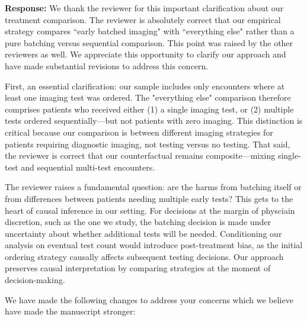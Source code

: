 \documentclass[11pt]{article}
\newcommand{\1}{\hbox{\rm 1\kern-.35em 1}}
\begin{document}
\noindent\textbf{Response:} \color{blue}We thank the reviewer for this important clarification about our treatment comparison. The reviewer is absolutely correct that our empirical strategy compares ``early batched imaging" with ``everything else" rather than a pure batching versus sequential comparison. This point was raised by the other reviewers as well. We appreciate this opportunity to clarify our approach and have made substantial revisions to address this concern.

First, an essential clarification: our sample includes only encounters where at least one imaging test was ordered. The "everything else" comparison therefore comprises patients who received either (1) a single imaging test, or (2) multiple tests ordered sequentially—but not patients with zero imaging. This distinction is critical because our comparison is between different imaging strategies for patients requiring diagnostic imaging, not testing versus no testing. That said, the reviewer is correct that our counterfactual remains composite—mixing single-test and sequential multi-test encounters.

The reviewer raises a fundamental question: are the harms from batching itself or from differences between patients needing multiple early tests? This gets to the heart of causal inference in our setting. For decisions at the margin of physciain discretion, such as the one we study, the batching decision is made under uncertainty about whether additional tests will be needed. Conditioning our analysis on eventual test count would introduce post-treatment bias, as the initial ordering strategy causally affects subsequent testing decisions. Our approach preserves causal interpretation by comparing strategies at the moment of decision-making.

We have made the following changes to address your concerns which we believe have made the manuscript stronger:
\end{document}
